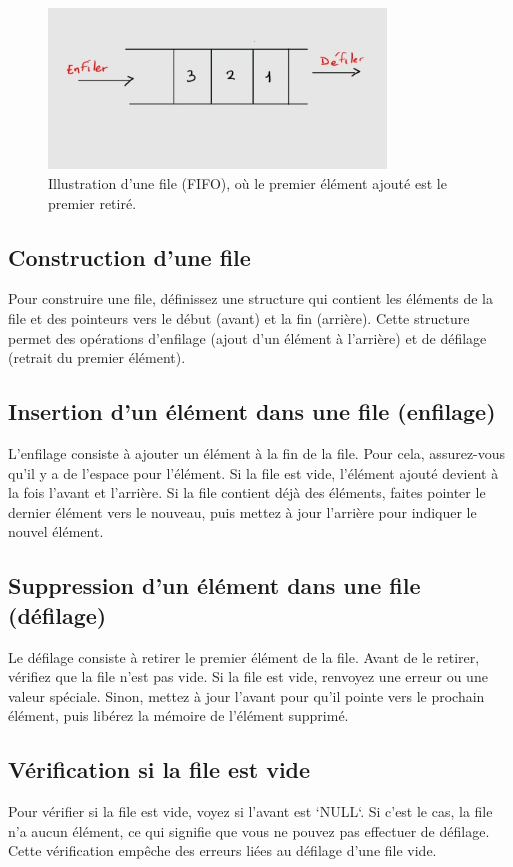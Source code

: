 \begin{figure}[H]
	\centering
	 \includegraphics[width=0.8\textwidth]{image/q}  %
	\caption{Illustration d'une file (FIFO), où le premier élément ajouté est le premier retiré.}
\end{figure}

\subsection{Construction d'une file}
Pour construire une file, définissez une structure qui contient les éléments de la file et des pointeurs vers le début (avant) et la fin (arrière). Cette structure permet des opérations d'enfilage (ajout d'un élément à l'arrière) et de défilage (retrait du premier élément).

\subsection{Insertion d'un élément dans une file (enfilage)}
L'enfilage consiste à ajouter un élément à la fin de la file. Pour cela, assurez-vous qu'il y a de l'espace pour l'élément. Si la file est vide, l'élément ajouté devient à la fois l'avant et l'arrière. Si la file contient déjà des éléments, faites pointer le dernier élément vers le nouveau, puis mettez à jour l'arrière pour indiquer le nouvel élément.

\subsection{Suppression d'un élément dans une file (défilage)}
Le défilage consiste à retirer le premier élément de la file. Avant de le retirer, vérifiez que la file n'est pas vide. Si la file est vide, renvoyez une erreur ou une valeur spéciale. Sinon, mettez à jour l'avant pour qu'il pointe vers le prochain élément, puis libérez la mémoire de l'élément supprimé.

\subsection{Vérification si la file est vide}
Pour vérifier si la file est vide, voyez si l'avant est `NULL`. Si c'est le cas, la file n'a aucun élément, ce qui signifie que vous ne pouvez pas effectuer de défilage. Cette vérification empêche des erreurs liées au défilage d'une file vide.

